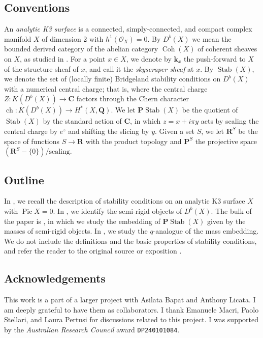 \documentclass{amsart}
\begin{document}
\subsection{Conventions}
An \emph{analytic K3 surface} is a connected, simply-connected, and compact complex manifold \(X\) of dimension 2 with \(h^1(\mathcal{O}_X) = 0\).
By \(D^b(X)\) we mean the bounded derived category of the abelian category \(\operatorname{Coh}(X)\) of coherent sheaves on \(X\), as studied in \cite{huy.mac.ste:08}.
For a point \(x \in X\), we denote by \(\mathbf{k}_x\) the push-forward to \(X\) of the structure sheaf of \(x\), and call it the \emph{skyscraper sheaf} at \(x\).
By \(\operatorname{Stab}(X)\), we denote the set of (locally finite) Bridgeland stability conditions on \(D^b(X)\) with a numerical central charge; that is, where the central charge \(Z \colon K(D^b(X)) \to \mathbf{C}\) factors through the Chern character \(\operatorname{ch} \colon K(D^b(X)) \to H^{*}(X, \mathbf{Q})\).
We let \(\mathbf{P} \operatorname{Stab}(X)\) be the quotient of \(\operatorname{Stab}(X)\) by the standard action of \(\mathbf{C}\), in which \(z = x + i\pi y\) acts by scaling the central charge by \(e^{z}\) and shifting the slicing by \(y\).
Given a set \(S\), we let \(\mathbf{R}^S\) be the space of functions \(S \to \mathbf{R}\) with the product topology and \(\mathbf{P}^S\) the projective space \(\left(\mathbf{R}^S - \{0\}\right) / \text{scaling}\).
\subsection{Outline}
In , we recall the description of stability conditions on an analytic K3 surface \(X\) with \(\operatorname{Pic} X = 0\).
In , we identify the semi-rigid objects of \(D^b(X)\).
The bulk of the paper is , in which we study the embedding of \(\mathbf{P} \operatorname{Stab}(X)\) given by the masses of semi-rigid objects.
In , we study the \(q\)-analogue of the mass embedding.
We do not include the definitions and the basic properties of stability conditions, and refer the reader to the original source \cite{bri:07} or exposition \cite{bay:11}.

\subsection{Acknowledgements}
This work is a part of a larger project with Asilata Bapat and Anthony Licata.
I am deeply grateful to have them as collaborators.
I thank Emanuele Macri, Paolo Stellari, and Laura Pertusi for discussions related to this project.
I was supported by the \emph{Australian Research Council} award \texttt{DP240101084}.
\end{document}
